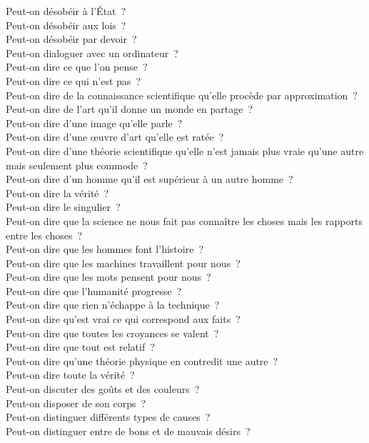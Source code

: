 \documentclass[a4paper,12pt]{article}
\begin{document}
Peut-on désobéir à l'État ? \\
Peut-on désobéir aux lois ? \\
Peut-on désobéir par devoir ? \\
Peut-on dialoguer avec un ordinateur ? \\
Peut-on dire ce que l'on pense ? \\
Peut-on dire ce qui n'est pas ? \\
Peut-on dire de la connaissance scientifique qu'elle procède par approximation ? \\
Peut-on dire de l'art qu'il donne un monde en partage ? \\
Peut-on dire d'une image qu'elle parle ? \\
Peut-on dire d'une œuvre d'art qu'elle est ratée ? \\
Peut-on dire d'une théorie scientifique qu'elle n'est jamais plus vraie qu'une autre mais seulement plus commode ? \\
Peut-on dire d'un homme qu'il est supérieur à un autre homme ? \\
Peut-on dire la vérité ? \\
Peut-on dire le singulier ? \\
Peut-on dire que la science ne nous fait pas connaître les choses mais les rapports entre les choses ? \\
Peut-on dire que les hommes font l'histoire ? \\
Peut-on dire que les machines travaillent pour nous ? \\
Peut-on dire que les mots pensent pour nous ? \\
Peut-on dire que l'humanité progresse ? \\
Peut-on dire que rien n'échappe à la technique ? \\
Peut-on dire qu'est vrai ce qui correspond aux faits ? \\
Peut-on dire que toutes les croyances se valent ? \\
Peut-on dire que tout est relatif ? \\
Peut-on dire qu'une théorie physique en contredit une autre ? \\
Peut-on dire toute la vérité ? \\
Peut-on discuter des goûts et des couleurs ? \\
Peut-on disposer de son corps ? \\
Peut-on distinguer différents types de causes ? \\
Peut-on distinguer entre de bons et de mauvais désirs ? \\
\end{document}
